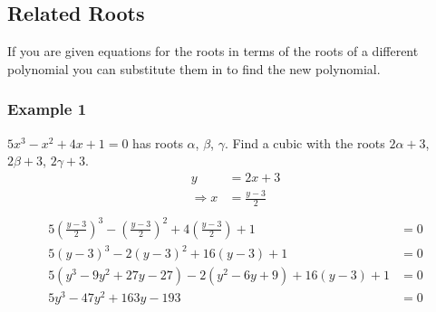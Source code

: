 \documentclass[a4paper,12pt]{article}
\begin{document}
\subsection*{Related Roots}
If you are given equations for the roots in terms of the roots of a different polynomial you can substitute them in to find the new polynomial. \\

\subsubsection*{Example 1}
$5x^3 - x^2 + 4x + 1 = 0$ has roots $\alpha$, $\beta$, $\gamma$. Find a cubic with the roots $2 \alpha + 3$, $2 \beta + 3$, $2 \gamma + 3$. \\

\begin{align*}
y & = 2x+3 \\
\Rightarrow x & = \frac{y-3}{2} \\
\end{align*}
\begin{align*}
5(\frac{y-3}{2})^3 - (\frac{y-3}{2})^2 + 4(\frac{y-3}{2}) + 1 & = 0 \\
5(y-3)^3 - 2(y-3)^2 + 16(y-3) +1 & = 0 \\
5(y^3 -9y^2 + 27y -27) -2(y^2 -6y +9) + 16(y-3) +1 & = 0 \\
5y^3 - 47y^2 + 163y -193 & = 0 \\
\end{align*}
\end{document}

